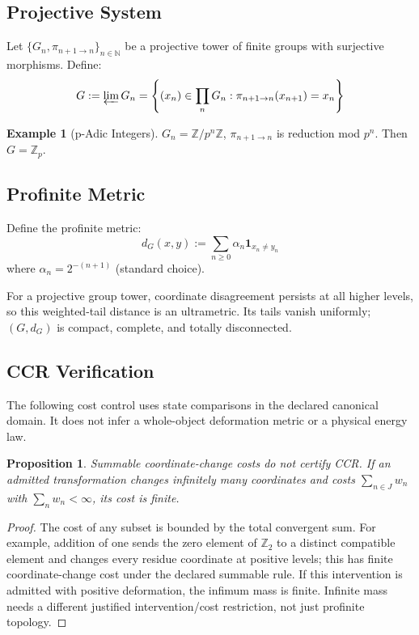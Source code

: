 \documentclass[11pt,a4paper]{article}
\theoremstyle{plain}
\newtheorem{proposition}[theorem]{Proposition}
\theoremstyle{definition}
\newtheorem{example}[theorem]{Example}
\theoremstyle{remark}
\begin{document}
\subsection{Projective System}

Let $\{G_n, \pi_{n+1 \to n}\}_{n \in \mathbb{N}}$ be a projective tower of finite groups with surjective morphisms. Define:
\[
G := \varprojlim G_n = \left\{ (x_n) \in \prod_n G_n : \pi_{n+1 \to n}(x_{n+1}) = x_n \right\}
\]

\begin{example}[p-Adic Integers]
$G_n = \mathbb{Z}/p^n\mathbb{Z}$, $\pi_{n+1 \to n}$ is reduction mod $p^n$. Then $G = \mathbb{Z}_p$.
\end{example}

\subsection{Profinite Metric}

Define the profinite metric:
\[
d_G(x, y) := \sum_{n \geq 0} \alpha_n \mathbf{1}_{x_n \neq y_n}
\]
where $\alpha_n = 2^{-(n+1)}$ (standard choice).

For a projective group tower, coordinate disagreement persists at all higher levels, so this weighted-tail distance is an ultrametric. Its tails vanish uniformly; $(G,d_G)$ is compact, complete, and totally disconnected.

\subsection{CCR Verification}

The following cost control uses state comparisons in the declared canonical domain. It does not infer a whole-object deformation metric or a physical energy law.


\begin{proposition}
Summable coordinate-change costs do not certify CCR. If an admitted transformation changes infinitely many coordinates and costs $\sum_{n\in J}w_n$ with $\sum_n w_n<\infty$, its cost is finite.
\end{proposition}

\begin{proof}
The cost of any subset is bounded by the total convergent sum. For example, addition of one sends the zero element of $\mathbb Z_2$ to a distinct compatible element and changes every residue coordinate at positive levels; this has finite coordinate-change cost under the declared summable rule. If this intervention is admitted with positive deformation, the infimum mass is finite. Infinite mass needs a different justified intervention/cost restriction, not just profinite topology.
\end{proof}
\end{document}
